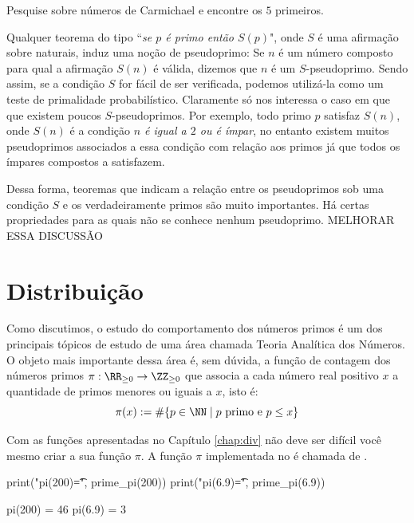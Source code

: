 \begin{exercise}
  Pesquise sobre números de Carmichael e encontre os $5$ primeiros.
\end{exercise}

Qualquer teorema do tipo ``\emph{se $p$ é primo então $S(p)$}",
onde $S$ é uma afirmação sobre naturais, induz uma noção
de pseudoprimo: Se $n$ é um número composto para
qual a afirmação $S(n)$ é válida, dizemos que $n$ é um
$S$-pseudoprimo. Sendo assim, se a condição $S$ for
fácil de ser verificada, podemos utilizá-la como
um teste de  primalidade probabilístico. Claramente
só nos interessa o caso em que que existem poucos 
$S$-pseudoprimos. Por exemplo, todo primo $p$
satisfaz $S(n)$, onde $S(n)$ é a 
condição \emph{$n$ é igual a $2$ ou é ímpar}, no 
entanto existem muitos pseudoprimos associados a
essa condição com relação aos primos já que
todos os ímpares compostos a satisfazem. 

Dessa forma, teoremas
que indicam a relação entre os pseudoprimos sob
uma condição $S$ e os verdadeiramente primos 
são muito importantes. Há certas propriedades
para as quais não se conhece nenhum pseudoprimo. 
MELHORAR ESSA DISCUSSÃO




\section{Distribuição}

Como discutimos, o estudo do comportamento dos números primos
é um dos principais tópicos de estudo de uma área chamada
Teoria Analítica dos Números. O objeto mais importante
dessa área é, sem dúvida, a função de contagem dos números
primos 
$\pi:\RR_{\geq 0} \to \ZZ_{\geq 0}$ que associa a cada
número real positivo $x$ a quantidade de primos menores
ou iguais a $x$, isto é:
$$
  \pi(x):= \#\{p \in \NN \mid p\text{ primo e } p\leq x\}
$$

Com as funções apresentadas no Capítulo \ref{chap:div}
não deve ser difícil você mesmo criar a sua função $\pi$.
A função $\pi$ implementada no \Sage é chamada de .
\begin{sageinput}
print("pi(200)\t=", prime_pi(200))
print("pi(6.9)\t=", prime_pi(6.9))
\end{sageinput}
\begin{sageoutput}
pi(200) = 46
pi(6.9) = 3
\end{sageoutput}

